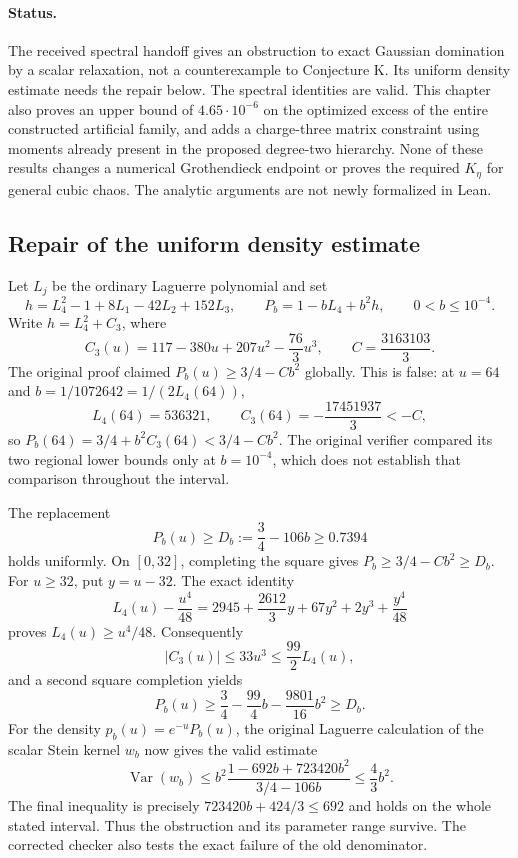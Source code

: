 \paragraph{Status.}
The received spectral handoff gives an obstruction to exact Gaussian
domination by a scalar relaxation, not a counterexample to Conjecture K.
Its uniform density estimate needs the repair below. The spectral identities
are valid. This chapter also proves an upper bound of $4.65\cdot10^{-6}$
on the optimized excess of the entire constructed artificial family, and
adds a charge-three matrix constraint using moments already present in the
proposed degree-two hierarchy. None of these results changes a numerical
Grothendieck endpoint or proves the required $K_\eta$ for general cubic chaos.
The analytic arguments are not newly formalized in Lean.

\subsection{Repair of the uniform density estimate}

Let $L_j$ be the ordinary Laguerre polynomial and set
\[
 h=L_4^2-1+8L_1-42L_2+152L_3,\qquad
 P_b=1-bL_4+b^2h,\qquad 0<b\le10^{-4}.
\]
Write $h=L_4^2+C_3$, where
\[
 C_3(u)=117-380u+207u^2-\frac{76}{3}u^3,
 \qquad C=\frac{3163103}{3}.
\]
The original proof claimed $P_b(u)\ge3/4-Cb^2$ globally. This is false:
at $u=64$ and $b=1/1072642=1/(2L_4(64))$,
\[
 L_4(64)=536321,\qquad C_3(64)=-\frac{17451937}{3}<-C,
\]
so $P_b(64)=3/4+b^2C_3(64)<3/4-Cb^2$.
The original verifier compared its two regional lower bounds only at
$b=10^{-4}$, which does not establish that comparison throughout the interval.

The replacement
\[
 \boxed{P_b(u)\ge D_b:=\frac34-106b\ge0.7394}
 \tag{S1}
\]
holds uniformly. On $[0,32]$, completing the square gives
$P_b\ge3/4-Cb^2\ge D_b$. For $u\ge32$, put $y=u-32$. The exact identity
\[
 L_4(u)-\frac{u^4}{48}
 =2945+\frac{2612}{3}y+67y^2+2y^3+\frac{y^4}{48}
\]
proves $L_4(u)\ge u^4/48$. Consequently
\[
 |C_3(u)|\le33u^3\le\frac{99}{2}L_4(u),
\]
and a second square completion yields
\[
 P_b(u)\ge\frac34-\frac{99}{4}b-\frac{9801}{16}b^2\ge D_b.
\]
For the density $p_b(u)=e^{-u}P_b(u)$, the original Laguerre calculation of
the scalar Stein kernel $w_b$ now gives the valid estimate
\[
 \operatorname{Var}(w_b)
 \le b^2\frac{1-692b+723420b^2}{3/4-106b}
 \le\frac43b^2.
 \tag{S2}
\]
The final inequality is precisely $723420b+424/3\le692$ and holds on the
whole stated interval. Thus the obstruction and its parameter range survive.
The corrected checker also tests the exact failure of the old denominator.

